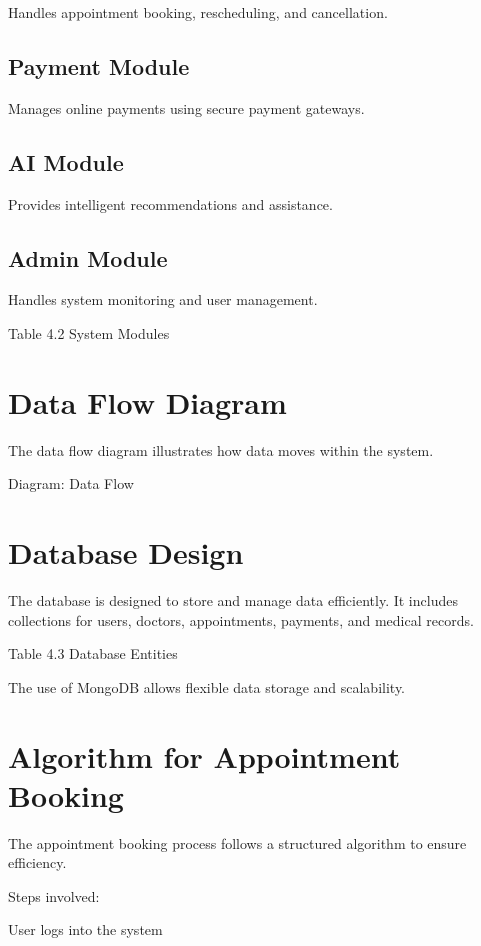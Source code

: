 Handles appointment booking, rescheduling, and cancellation.

\subsection{Payment Module}

Manages online payments using secure payment gateways.

\subsection{AI Module}

Provides intelligent recommendations and assistance.

\subsection{Admin Module}

Handles system monitoring and user management.

Table 4.2 System Modules

\section{Data Flow Diagram}

The data flow diagram illustrates how data moves within the system.

Diagram: Data Flow

\section{Database Design}

The database is designed to store and manage data efficiently. It includes collections for users, doctors, appointments, payments, and medical records.

Table 4.3 Database Entities

The use of MongoDB allows flexible data storage and scalability.

\section{Algorithm for Appointment Booking}

The appointment booking process follows a structured algorithm to ensure efficiency.

Steps involved:

User logs into the system

